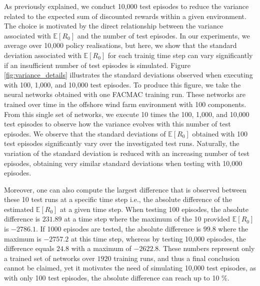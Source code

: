 As previously explained, we conduct 10,000 test episodes to reduce the variance related to the expected sum of discounted rewards within a given environment.
The choice is motivated by the direct relationship between the variance associated with $\mathbb{E}[R_{0}]$ and the number of test episodes. 
In our experiments, we average over 10,000 policy realisations, but here, we show that the standard deviation associated with $\mathbb{E}[R_{0}]$ for each trainig time step can vary significantly if an insufficient number of test episodes is simulated.
Figure \ref{fig:variance_details} illustrates the standard deviations observed when executing with 100, 1,000, and 10,000 test episodes.
To produce this figure, we take the neural networks obtained with one FACMAC training run.
These networks are trained over time in the offshore wind farm environment with 100 components.
From this single set of networks, we execute 10 times the 100, 1,000, and 10,000 test episodes to observe how the variance evolves with this number of test episodes.
We observe that the standard deviations of $\mathbb{E}[R_{0}]$ obtained with 100 test episodes significantly vary over the investigated test runs.
Naturally, the variation of the standard deviation is reduced with an increasing number of test episodes, obtaining very similar standard deviations when testing with 10,000 episodes.

Moreover, one can also compute the largest difference that is observed between these 10 test runs at a specific time step i.e., the absolute difference of the estimated $\mathbb{E}[R_{0}]$ at a given time step.
When testing 100 episodes, the absolute difference is $231.89$ at a time step where the maximum of the 10 provided $\mathbb{E}[R_{0}]$ is $ -2786.1$.
If 1000 episodes are tested, the absolute difference is $99.8$ where the maximum is $-2757.2$ at this time step, whereas by testing 10,000 episodes, the difference equals $24.8$ with a maximum of $-2622.8$.
These numbers represent only a trained set of networks over $1920$ training runs, and thus a final conclusion cannot be claimed, yet it motivates the need of simulating 10,000 test episodes, as with only 100 test episodes, the absolute difference can reach up to 10 \%.
